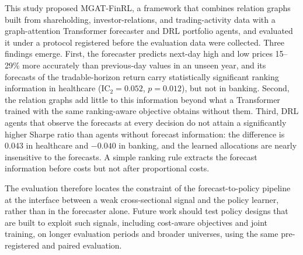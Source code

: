 {\color{blue}This study proposed MGAT-FinRL, a framework that combines relation graphs built from shareholding, investor-relations, and trading-activity data with a graph-attention Transformer forecaster and DRL portfolio agents, and evaluated it under a protocol registered before the evaluation data were collected. Three findings emerge. First, the forecaster predicts next-day high and low prices 15--29\% more accurately than previous-day values in an unseen year, and its forecasts of the tradable-horizon return carry statistically significant ranking information in healthcare (IC$_2=0.052$, $p=0.012$), but not in banking. Second, the relation graphs add little to this information beyond what a Transformer trained with the same ranking-aware objective obtains without them. Third, DRL agents that observe the forecasts at every decision do not attain a significantly higher Sharpe ratio than agents without forecast information: the difference is 0.043 in healthcare and $-0.040$ in banking, and the learned allocations are nearly insensitive to the forecasts. A simple ranking rule extracts the forecast information before costs but not after proportional costs.

The evaluation therefore locates the constraint of the forecast-to-policy pipeline at the interface between a weak cross-sectional signal and the policy learner, rather than in the forecaster alone. Future work should test policy designs that are built to exploit such signals, including cost-aware objectives and joint training, on longer evaluation periods and broader universes, using the same pre-registered and paired evaluation.\par}
